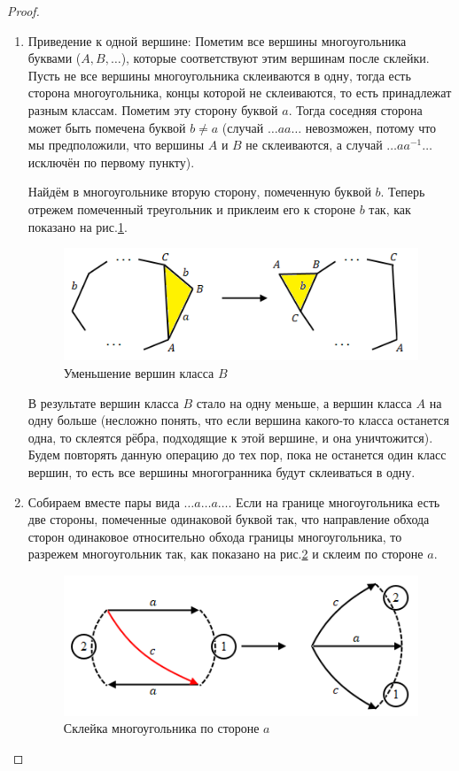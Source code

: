 \begin{proof}
\begin{enumerate}
        \item Приведение к одной вершине: 
        Пометим все вершины многоугольника буквами ($A,B, \dots$), которые соответствуют этим вершинам после склейки. Пусть не все вершины многоугольника склеиваются в одну, тогда есть сторона многоугольника, концы которой не склеиваются, то есть принадлежат разным классам. Пометим эту сторону буквой $a$. Тогда соседняя сторона может быть помечена буквой $b \neq a$ (случай $\dots aa \dots$ невозможен, потому что мы предположили, что вершины $A$ и $B$ не склеиваются, а случай $\dots aa^{-1} \dots$ исключён по первому пункту).

        Найдём в многоугольнике вторую сторону, помеченную буквой $b$. Теперь отрежем помеченный треугольник и приклеим его к стороне $b$ так, как показано на рис.\ref{fig:c10.5}.

        \begin{figure}[htbp]
            \centering
            \includegraphics[scale=0.7]{images/c10.5.png}
            \caption{Уменьшение вершин класса $B$}
            \label{fig:c10.5}
        \end{figure}

        В результате вершин класса $B$ стало на одну меньше, а вершин класса $A$ на одну больше (несложно понять, что если вершина какого-то класса останется одна, то склеятся рёбра, подходящие к этой вершине, и она уничтожится). Будем повторять данную операцию до тех пор, пока не останется один класс вершин, то есть все вершины многогранника будут склеиваться в одну.

        \item Собираем вместе пары вида $\dots a \dots a \dots$. Если на границе многоугольника есть две стороны, помеченные одинаковой буквой так, что направление обхода сторон одинаковое относительно обхода границы многоугольника, то разрежем многоугольник так, как показано на рис.\ref{fig:c10.6} и склеим по стороне $a$.
        
        \begin{figure}[htbp]
            \centering
            \includegraphics[scale=0.7]{images/c10.6.png}
            \caption{Склейка многоугольника по стороне $a$}
            \label{fig:c10.6}
        \end{figure}


\end{enumerate}
\end{proof}
